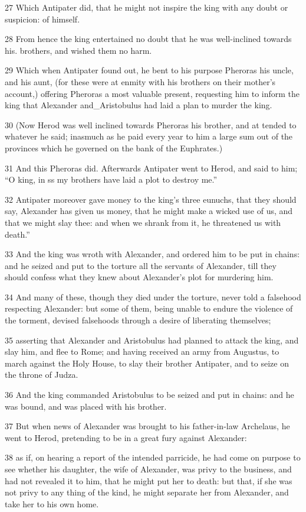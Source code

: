 27 Which Antipater did, that he might not inspire the king with any doubt or suspicion: of himself. 

28 From hence the king entertained no doubt that he was well-inclined towards his. brothers, and wished them no harm. 

29 Which when Antipater found out, he bent to his purpose Pheroras his uncle, and his aunt, (for these were at enmity with his brothers on their mother’s account,) offering Pheroras a most valuable present, requesting him to inform the king that Alexander and_Aristobulus had laid a plan to murder the king. 

30 (Now Herod was well inclined towards Pheroras his brother, and at tended to whatever he said; inasmuch as he paid every year to him a large sum out of the provinces which he governed on the bank of the Euphrates.) 

31 And this Pheroras did. Afterwards Antipater went to Herod, and said to him; “O king, in ss my brothers have laid a plot to destroy me.” 

32 Antipater moreover gave money to the king's three eunuchs, that they should say, Alexander has given us money, that he might make a wicked use of us, and that we might slay thee: and when we shrank from it, he threatened us with death.” 

33 And the king was wroth with Alexander, and ordered him to be put in chains: and he seized and put to the torture all the servants of Alexander, till they should confess what they knew about Alexander’s plot for murdering him. 

34 And many of these, though they died under the torture, never told a falsehood respecting Alexander: but some of them, being unable to endure the violence of the torment, devised falsehoods through a desire of liberating themselves; 

35 asserting that Alexander and Aristobulus had planned to attack the king, and slay him, and flee to Rome; and having received an army from Augustus, to march against the Holy House, to slay their brother Antipater, and to seize on the throne of Judza. 

36 And the king commanded Aristobulus to be seized and put in chains: and he was bound, and was placed with his brother. 

37 But when news of Alexander was brought to his father-in-law Archelaus, he went to Herod, pretending to be in a great fury against Alexander: 


38 as if, on hearing a report of the intended parricide, he had come on purpose to see whether his daughter, the wife of Alexander, was privy to the business, and had not revealed it to him, that he might put her to death: but that, if she was not privy to any thing of the kind, he might separate her from Alexander, and take her to his own home. 

